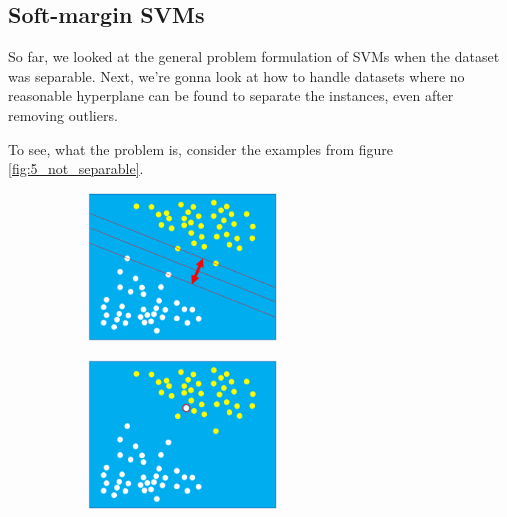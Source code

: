 \subsection{Soft-margin SVMs}
So far, we looked at the general problem formulation of SVMs when the dataset was separable. Next, we're gonna look at how to handle datasets where no reasonable hyperplane can be found to separate the instances, even after removing outliers.

To see, what the problem is, consider the examples from figure \ref{fig:5_not_separable}.

\begin{figure}[H]
  \centering
  \begin{subfigure}{0.47\textwidth}
    \centering
    \includegraphics[width=0.55\textwidth]{assets/svm/sm__nice_separation.png}
  \end{subfigure}\hspace*{0.05\textwidth}
  \begin{subfigure}{0.47\textwidth}
    \centering
    \includegraphics[width=0.55\textwidth]{assets/svm/sm__separation_1_outlier.png}
  \end{subfigure}

  \vspace*{0.3cm}


\end{figure}
